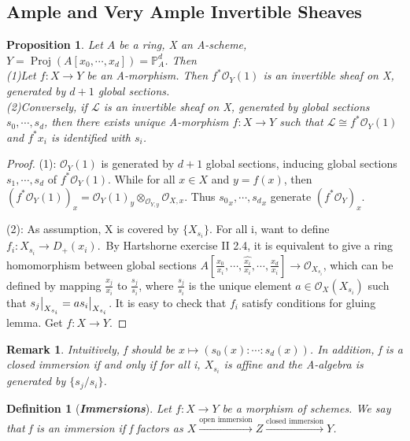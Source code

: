 \documentclass{ctexart}
\newtheorem{definition}{Definition}[section]
\newtheorem{remark}{Remark}[section]
\newtheorem{proposition}{Proposition}[section]
\newcommand{\proj}{\operatorname{Proj}}
\begin{document}
\subsection{Ample and Very Ample Invertible Sheaves}
\begin{proposition}
    Let $A$ be a ring, X an A-scheme, $Y = \proj(A[x_{0}, \cdots, x_{d}]) = \mathbb{P}_{A}^{d}$.
    Then \\
    (1)Let $f: X \longrightarrow Y$ be an A-morphism.
    Then $f^{\ast}\mathcal{O}_{Y}(1)$ is an invertible sheaf on X, generated by $d + 1$ global sections. \\
    (2)Conversely, if $\mathcal{L}$ is an invertible sheaf on X, generated by global sections $s_{0}, \cdots, s_{d}$,
    then there exists unique A-morphism $f: X \longrightarrow Y$ such that $\mathcal{L} \cong f^{\ast}\mathcal{O}_{Y}(1)$ and $f^{\ast}x_{i}$ is identified with $s_{i}$.
    \label{Proposition 6.10}
\end{proposition}
\begin{proof}
    (1): $\mathcal{O}_{Y}(1)$ is generated by $d + 1$ global sections, inducing global sections $s_{1}, \cdots, s_{d}$ of $f^{\ast}\mathcal{O}_{Y}(1)$.
    While for all $x\in X$ and $y = f(x)$, then $(f^{\ast}\mathcal{O}_{Y}(1))_{x} = \mathcal{O}_{Y}(1)_{y} \otimes_{\mathcal{O}_{Y, y}} \mathcal{O}_{X, x}$.
    Thus ${s_{0}}_{x}, \cdots, {s_{d}}_{x}$ generate $(f^{\ast}\mathcal{O}_{Y})_{x}$.
    \par
    (2): As assumption, X is covered by $\{X_{s_{i}}\}$.
    For all i, want to define $f_{i}: X_{s_{i}} \longrightarrow D_{+}(x_{i})$.\
    By Hartshorne exercise II 2.4, it is equivalent to give a ring homomorphism between global sections $A[\frac{x_{0}}{x_{i}}, \cdots, \widehat{\frac{x_{i}}{x_{i}}}, \cdots, \frac{x_{d}}{x_{i}}] \longrightarrow \mathcal{O}_{X_{s_{i}}}$,
    which can be defined by mapping $\frac{x_{j}}{x_{i}}$ to $\frac{s_{j}}{s_{i}}$,
    where $\frac{s_{j}}{s_{i}}$ is the unique element $a\in \mathcal{O}_{X}(X_{s_{i}})$ such that $s_{j}\big{|}_{X_{s_{i}}} = as_{i}\big{|}_{X_{s_{i}}}$.
    It is easy to check that $f_{i}$ satisfy conditions for gluing lemma.
    Get $f: X \longrightarrow Y$.
\end{proof}
\begin{remark}
    Intuitively, f should be $x \longmapsto (s_{0}(x) : \cdots : s_{d}(x))$.
    In addition, f is a closed immersion if and only if for all i, $X_{s_{i}}$ is affine and the A-algebra is generated by $\{s_{j}/s_{i}\}$.
\end{remark}
\begin{definition}[\textbf{\emph{Immersions}}]
    Let $f: X \longrightarrow Y$ be a morphism of schemes.
    We say that f is an immersion if f factors as $X \overset{\text{open immersion}}{\longrightarrow} Z \overset{\text{closed immersion}}{\longrightarrow} Y$.
\end{definition}
\end{document}
